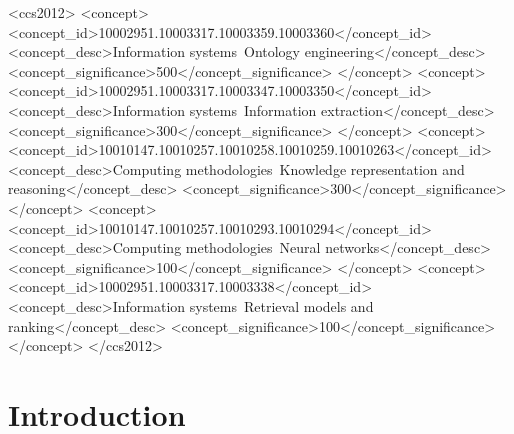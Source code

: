 \documentclass[sigconf,review,anonymous]{acmart}
\begin{document}
\begin{CCSXML}
<ccs2012>
 <concept>
  <concept_id>10002951.10003317.10003359.10003360</concept_id>
  <concept_desc>Information systems~Ontology engineering</concept_desc>
  <concept_significance>500</concept_significance>
 </concept>
 <concept>
  <concept_id>10002951.10003317.10003347.10003350</concept_id>
  <concept_desc>Information systems~Information extraction</concept_desc>
  <concept_significance>300</concept_significance>
 </concept>
 <concept>
  <concept_id>10010147.10010257.10010258.10010259.10010263</concept_id>
  <concept_desc>Computing methodologies~Knowledge representation and reasoning</concept_desc>
  <concept_significance>300</concept_significance>
 </concept>
 <concept>
  <concept_id>10010147.10010257.10010293.10010294</concept_id>
  <concept_desc>Computing methodologies~Neural networks</concept_desc>
  <concept_significance>100</concept_significance>
 </concept>
 <concept>
  <concept_id>10002951.10003317.10003338</concept_id>
  <concept_desc>Information systems~Retrieval models and ranking</concept_desc>
  <concept_significance>100</concept_significance>
 </concept>
</ccs2012>
\end{CCSXML}


\maketitle
\section{Introduction}
\end{document}
